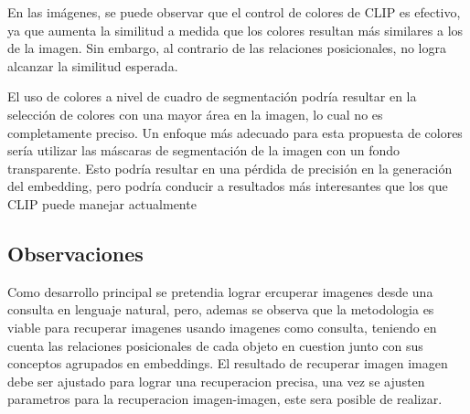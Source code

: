 En las imágenes, se puede observar que el control de colores de CLIP es efectivo, ya que aumenta la similitud a medida que los colores resultan más similares a los de la imagen. Sin embargo, al contrario de las relaciones posicionales, no logra alcanzar la similitud esperada.

El uso de colores a nivel de cuadro de segmentación podría resultar en la selección de colores con una mayor área en la imagen, lo cual no es completamente preciso. Un enfoque más adecuado para esta propuesta de colores sería utilizar las máscaras de segmentación de la imagen con un fondo transparente. Esto podría resultar en una pérdida de precisión en la generación del embedding, pero podría conducir a resultados más interesantes que los que CLIP puede manejar actualmente

 \subsection*{Observaciones}

Como desarrollo principal se pretendia lograr ercuperar imagenes desde una consulta en lenguaje natural, pero, ademas se observa que la metodologia es viable para recuperar imagenes usando imagenes como consulta, teniendo en cuenta las relaciones posicionales de cada objeto en cuestion junto con sus conceptos agrupados en embeddings. El resultado de recuperar imagen imagen debe ser ajustado para lograr una recuperacion precisa, una vez se ajusten parametros para la recuperacion imagen-imagen, este sera posible de realizar.
